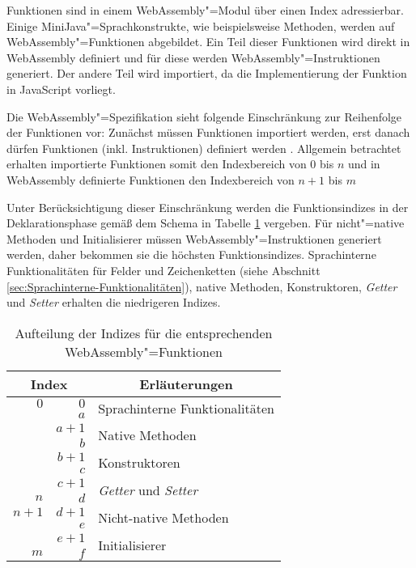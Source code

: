 Funktionen sind in einem WebAssembly"=Modul über einen Index adressierbar. Einige MiniJava"=Sprachkonstrukte, wie beispielsweise Methoden, werden auf WebAssembly"=Funktionen abgebildet. Ein Teil dieser Funktionen wird direkt in WebAssembly definiert und für diese werden WebAssembly"=Instruktionen generiert. Der andere Teil wird importiert, da die Implementierung der Funktion in JavaScript vorliegt.

Die WebAssembly"=Spezifikation sieht folgende Einschränkung zur Reihenfolge der Funktionen vor: Zunächst müssen Funktionen importiert werden, erst danach dürfen Funktionen (inkl. Instruktionen) definiert werden \cite{WebAssemblySpecification}. Allgemein betrachtet erhalten importierte Funktionen somit den Indexbereich von $0$ bis $n$ und in WebAssembly definierte Funktionen den Indexbereich von $n+1$ bis $m$ 

Unter Berücksichtigung dieser Einschränkung werden die Funktionsindizes in der Deklarationsphase gemäß dem Schema in Tabelle \ref{tab:functionIndices} vergeben. Für nicht"=native Methoden und Initialisierer müssen WebAssembly"=Instruktionen generiert werden, daher bekommen sie die höchsten Funktionsindizes. Sprachinterne Funktionalitäten für Felder und Zeichenketten (siehe Abschnitt \ref{sec:Sprachinterne-Funktionalitäten}), native Methoden, Konstruktoren, \emph{Getter} und \emph{Setter} erhalten die niedrigeren Indizes.

\begin{table}[b]
    \centering
    \begin{tabular}{| r | r | l |}
        \hline
        \multicolumn{2}{|c|}{Index} & \multicolumn{1}{|c|}{Erläuterungen} \\
        \hline
        \hline
        $0$ & $0$ & \multirow{2}{*}{Sprachinterne Funktionalitäten} \\
        & $a$ & \\
        \hline
        & $a+1$ & \multirow{2}{*}{Native Methoden} \\
        & $b$ & \\
        \hline
        & $b+1$ & \multirow{2}{*}{Konstruktoren} \\
        & $c$ & \\
        \hline
        & $c+1$ & \multirow{2}{*}{\emph{Getter} und \emph{Setter}} \\
        $n$ & $d$ & \\
        \hline \hline
        $n+1$ & $d+1$ & \multirow{2}{*}{Nicht-native Methoden} \\
        & $e$ & \\
        \hline
        & $e+1$ & \multirow{2}{*}{Initialisierer} \\
        $m$ & $f$ & \\
        \hline
    \end{tabular}
    \caption{Aufteilung der Indizes für die entsprechenden WebAssembly"=Funktionen}
    \label{tab:functionIndices}
\end{table}

